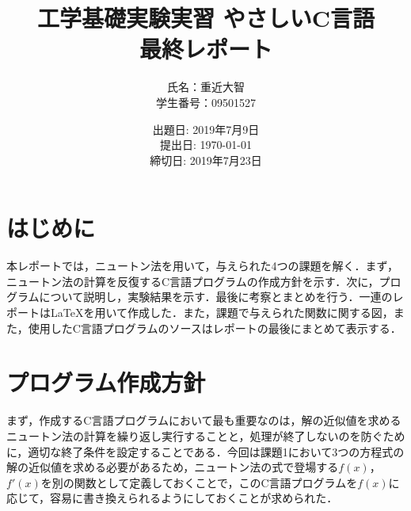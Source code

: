 \documentclass[12pt]{jarticle}
\renewcommand  \[  {\begin{eqnarray}}
\renewcommand  \]  {\end{eqnarray}}
\begin{document}
\title{工学基礎実験実習 やさしいC言語\\最終レポート}%
\date{出題日: 2019年7月9日 \\
      提出日: \today \\
      締切日: 2019年7月23日 \\} 
\author{氏名：重近大智\\学生番号：09501527}
\maketitle

\section{はじめに}
本レポートでは，ニュートン法を用いて，与えられた4つの課題を解く．まず，ニュートン法の計算を反復するC言語プログラムの作成方針を示す．次に，プログラムについて説明し，実験結果を示す．最後に考察とまとめを行う．一連のレポートは\LaTeX{}を用いて作成した．また，課題で与えられた関数に関する図，また，使用したC言語プログラムのソースはレポートの最後にまとめて表示する．

\section{プログラム作成方針}
まず，作成するC言語プログラムにおいて最も重要なのは，解の近似値を求めるニュートン法の計算を繰り返し実行することと，処理が終了しないのを防ぐために，適切な終了条件を設定することである．今回は課題1において3つの方程式の解の近似値を求める必要があるため，ニュートン法の式で登場する$f(x)$，$f\prime(x)$を別の関数として定義しておくことで，このC言語プログラムを$f(x)$に応じて，容易に書き換えられるようにしておくことが求められた．
\end{document}
